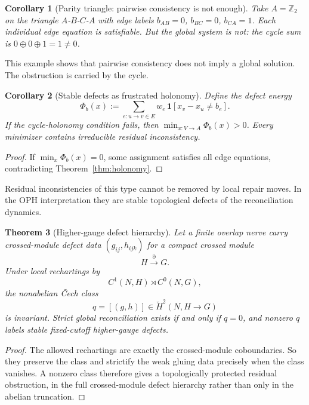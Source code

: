 \documentclass[11pt]{article}
\newtheorem{theorem}{Theorem}[section]
\newtheorem{corollary}[theorem]{Corollary}
\theoremstyle{remark}
\theoremstyle{plain}
\begin{document}
\begin{corollary}[Parity triangle: pairwise consistency is not enough]\label{cor:triangle}
Take $A=\mathbb{Z}_2$ on the triangle $A$-$B$-$C$-$A$ with edge labels $b_{AB}=0$, $b_{BC}=0$, $b_{CA}=1$. Each individual edge equation is satisfiable. But the global system is not: the cycle sum is $0\oplus 0\oplus 1 = 1\neq 0$.
\end{corollary}

This example shows that pairwise consistency does not imply a global solution. The obstruction is
carried by the cycle.

\begin{corollary}[Stable defects as frustrated holonomy]\label{cor:defects}
Define the defect energy
\[
\Phi_b(x) := \sum_{e:u\to v\in E} w_e\,\mathbf{1}\!\left[x_v - x_u \neq b_e\right].
\]
If the cycle-holonomy condition fails, then $\min_{x:V\to A}\Phi_b(x)>0$. Every minimizer contains irreducible residual inconsistency.
\end{corollary}

\begin{proof}
If $\min_x\Phi_b(x)=0$, some assignment satisfies all edge equations, contradicting Theorem~\ref{thm:holonomy}.
\end{proof}

Residual inconsistencies of this type cannot be removed by local repair moves. In the OPH
interpretation they are stable topological defects of the reconciliation dynamics.

\begin{theorem}[Higher-gauge defect hierarchy]\label{thm:higherdefects}
Let a finite overlap nerve carry crossed-module defect data \((g_{ij},h_{ijk})\) for a compact crossed module
\[
H\xrightarrow{\partial} G.
\]
Under local rechartings by
\[
C^1(N,H)\rtimes C^0(N,G),
\]
the nonabelian \v{C}ech class
\[
q=[(g,h)]\in \check H^2(N,H\to G)
\]
is invariant. Strict global reconciliation exists if and only if \(q=0\), and nonzero \(q\) labels stable fixed-cutoff higher-gauge defects.
\end{theorem}

\begin{proof}
The allowed rechartings are exactly the crossed-module coboundaries. So they preserve the class and strictify the weak gluing data precisely when the class vanishes. A nonzero class therefore gives a topologically protected residual obstruction, in the full crossed-module defect hierarchy rather than only in the abelian truncation.
\end{proof}
\end{document}
